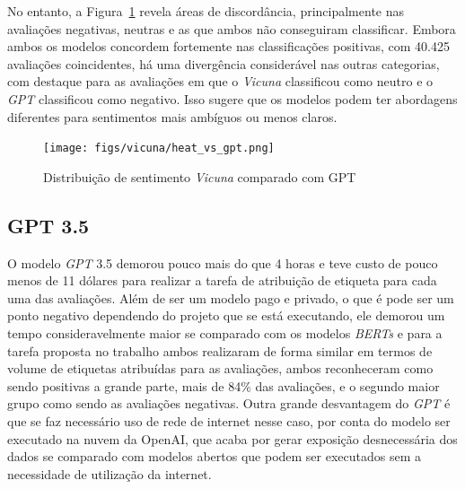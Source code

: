No entanto, a Figura~\ref{img:heat_vicuna_vs_gpt} revela áreas de discordância, principalmente nas avaliações negativas, neutras e as que ambos não conseguiram classificar. Embora ambos os modelos concordem fortemente nas classificações positivas, com 40.425 avaliações coincidentes, há uma divergência considerável nas outras categorias, com destaque para as avaliações em que o \textit{Vicuna} classificou como neutro e o \textit{GPT} classificou como negativo. Isso sugere que os modelos podem ter abordagens diferentes para sentimentos mais ambíguos ou menos claros.

\begin{figure}
	\centering
	\texttt{[image: figs/vicuna/heat\_vs\_gpt.png]}
	\caption{Distribuição de sentimento \textit{Vicuna} comparado com GPT}
	\label{img:heat_vicuna_vs_gpt}
\end{figure}


\subsection{GPT 3.5}
\label{sec:resultados:subsec:gpt}


O modelo \textit{GPT} 3.5 demorou pouco mais do que 4 horas e teve custo de pouco menos de 11 dólares para realizar a tarefa de atribuição de etiqueta para cada uma das avaliações. Além de ser um modelo pago e privado, o que é pode ser um ponto negativo dependendo do projeto que se está executando, ele demorou um tempo consideravelmente maior se comparado com os modelos \textit{BERTs} e para a tarefa proposta no trabalho ambos realizaram de forma similar em termos de volume de etiquetas atribuídas para as avaliações, ambos reconheceram como sendo positivas a grande parte, mais de 84\% das avaliações, e o segundo maior grupo como sendo as avaliações negativas. Outra grande desvantagem do \textit{GPT} é que se faz necessário uso de rede de internet nesse caso, por conta do modelo ser executado na nuvem da OpenAI, que acaba por gerar exposição desnecessária dos dados se comparado com modelos abertos que podem ser executados sem a necessidade de utilização da internet.


